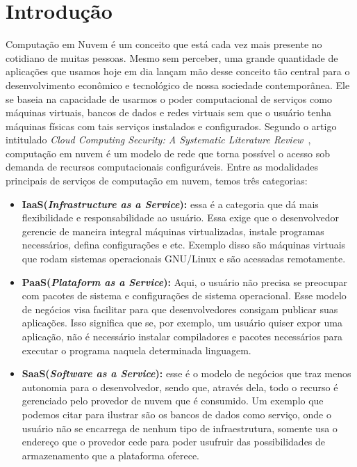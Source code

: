 \documentclass[11pt,twoside]{article}
\begin{document}
\section{Introdução}

Computação em Nuvem é um conceito que está cada vez mais presente no cotidiano de muitas pessoas. Mesmo sem perceber, uma grande quantidade de aplicações que usamos hoje 
em dia lançam mão desse conceito tão central para o desenvolvimento econômico e tecnológico de nossa sociedade contemporânea. Ele se baseia na capacidade de usarmos o
poder computacional de serviços como máquinas virtuais, bancos de dados e redes virtuais sem que o usuário tenha máquinas físicas com tais serviços 
instalados e configurados. Segundo o artigo intitulado \emph{Cloud Computing Security: A
Systematic Literature Review}~\cite{UPP}, computação em nuvem é um modelo de rede que torna possível o acesso sob demanda de recursos computacionais configuráveis.
Entre as modalidades principais de serviços de computação em nuvem, temos três categorias:

\begin{itemize}

  \item \textbf{IaaS(\emph{Infrastructure as a Service}):} essa é a categoria que dá mais flexibilidade e responsabilidade ao usuário. Essa exige que o desenvolvedor gerencie de maneira integral máquinas virtualizadas, 
  instale programas necessários, defina configurações e etc. Exemplo disso são máquinas virtuais que rodam sistemas operacionais GNU/Linux e são acessadas remotamente.
  \item \textbf{PaaS(\emph{Plataform as a Service}):} Aqui, o usuário não precisa se preocupar com pacotes de sistema e configurações de sistema operacional. Esse modelo de negócios visa 
  facilitar para que desenvolvedores consigam publicar suas aplicações. Isso significa que se, por exemplo, um usuário quiser expor uma aplicação, não é necessário
  instalar compiladores e pacotes necessários para executar o programa naquela determinada linguagem.
  \item \textbf{SaaS(\emph{Software as a Service}):} esse é o modelo de negócios que traz menos autonomia para o desenvolvedor, sendo que, através dela, todo o recurso é gerenciado pelo provedor de 
  nuvem que é consumido. Um exemplo que podemos citar para ilustrar são os bancos de dados como serviço, onde o usuário não se encarrega de nenhum tipo de infraestrutura, 
  somente usa o endereço que o provedor cede para poder usufruir das possibilidades de armazenamento que a plataforma oferece.

\end{itemize}
\end{document}
